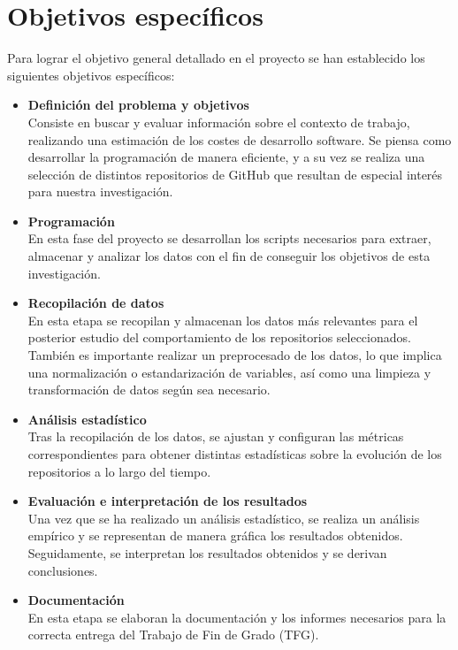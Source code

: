 \documentclass[a4paper, 12pt]{book}
\begin{document}
\section{Objetivos específicos}
\label{sec:objetivos-especificos}

Para lograr el objetivo general detallado en el proyecto se han establecido los siguientes objetivos específicos:
\begin{itemize}
  
  \item \textbf{Definición del problema y objetivos}
  \\Consiste en buscar y evaluar información sobre el contexto de trabajo, realizando una estimación de los
  costes de desarrollo software. Se piensa como desarrollar la programación de manera eficiente, y a su vez se realiza una selección de distintos
  repositorios de GitHub que resultan de especial interés para nuestra investigación.

  \item \textbf{Programación}
  \\En esta fase del proyecto se desarrollan los scripts necesarios para extraer, almacenar y analizar los datos con
  el fin de conseguir los objetivos de esta investigación.
  
  \item \textbf{Recopilación de datos}
  \\En esta etapa se recopilan y almacenan los datos más relevantes para el posterior estudio del comportamiento
  de los repositorios seleccionados. También es importante realizar un preprocesado de los datos, lo que implica una
  normalización o estandarización de variables, así como una limpieza y transformación de datos según sea necesario.
  
  \item \textbf{Análisis estadístico}
  \\Tras la recopilación de los datos, se ajustan y configuran las métricas correspondientes para obtener
  distintas estadísticas sobre la evolución de los repositorios a lo largo del tiempo.

  \item \textbf{Evaluación e interpretación de los resultados}
  \\Una vez que se ha realizado un análisis estadístico, se realiza un análisis empírico y se representan 
  de manera gráfica los resultados obtenidos. Seguidamente, se interpretan los resultados obtenidos y se
  derivan conclusiones.
 
  \item \textbf{Documentación}
  \\En esta etapa se elaboran la documentación y los informes necesarios para la correcta entrega del Trabajo de Fin de Grado (TFG).

\end{itemize}
\end{document}
